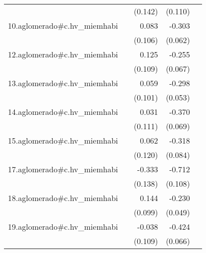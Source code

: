 {\begin{longtable}{l*{4}{D{.}{.}{-1}}}
            &                     &     (0.142)         &     (0.110)         &                     \\
\addlinespace
10.aglomerado#c.hv\_miemhabi&                     &       0.083         &      -0.303\sym{***}&                     \\
            &                     &     (0.106)         &     (0.062)         &                     \\
\addlinespace
12.aglomerado#c.hv\_miemhabi&                     &       0.125         &      -0.255\sym{***}&                     \\
            &                     &     (0.109)         &     (0.067)         &                     \\
\addlinespace
13.aglomerado#c.hv\_miemhabi&                     &       0.059         &      -0.298\sym{***}&                     \\
            &                     &     (0.101)         &     (0.053)         &                     \\
\addlinespace
14.aglomerado#c.hv\_miemhabi&                     &       0.031         &      -0.370\sym{***}&                     \\
            &                     &     (0.111)         &     (0.069)         &                     \\
\addlinespace
15.aglomerado#c.hv\_miemhabi&                     &       0.062         &      -0.318\sym{***}&                     \\
            &                     &     (0.120)         &     (0.084)         &                     \\
\addlinespace
17.aglomerado#c.hv\_miemhabi&                     &      -0.333\sym{*}  &      -0.712\sym{***}&                     \\
            &                     &     (0.138)         &     (0.108)         &                     \\
\addlinespace
18.aglomerado#c.hv\_miemhabi&                     &       0.144         &      -0.230\sym{***}&                     \\
            &                     &     (0.099)         &     (0.049)         &                     \\
\addlinespace
19.aglomerado#c.hv\_miemhabi&                     &      -0.038         &      -0.424\sym{***}&                     \\
            &                     &     (0.109)         &     (0.066)         &                     \\

\end{longtable}}
